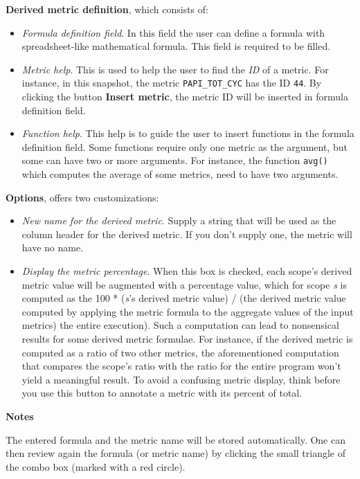 \documentclass[a4paper,11pt]{article}
\begin{document}
\textbf{Derived metric definition}, which consists of:   
\begin{itemize}
	\item \textit{Formula definition field}. In this field the user can define a formula with spreadsheet-like mathematical formula. This field is required to be filled.
	\item \textit{Metric help}. This is used to help the user to find the \textit{ID} of a metric.      For instance, in this snapshot, the metric 
\texttt{PAPI\_TOT\_CYC} has the ID 
\texttt{44}.      By clicking the button \textbf{Insert metric}, the metric ID will be inserted in formula definition field.
	\item \textit{Function help}. This help is to guide the user to insert functions in the formula definition field.      Some functions require only one metric as the argument, but some can have two or more arguments.     For instance, the function 
\texttt{avg()} which computes the average of some metrics, need to have two arguments.
\end{itemize}

\textbf{Options}, offers two customizations:    
\begin{itemize}
	\item \textit{New name for the derived metric}. Supply a string      that will be used as the column header for the derived      metric. If you don't supply one, the metric will have no name.
	\item \textit{Display the metric percentage}. When this box is      checked, each scope's derived metric value will be augmented with      a percentage value, which for scope \textit{s} is computed as the      100 * (\textit{s}'s derived metric value) / (the derived metric      value computed by      applying the metric formula to the aggregate values of the input      metrics)      the entire execution). Such a computation can lead to nonsensical      results for some derived metric formulae. For instance, if the      derived metric is computed as a ratio of two other metrics, the      aforementioned computation that compares the scope's ratio with      the ratio for the entire program won't yield a meaningful result.      To avoid a confusing metric display, think before you use this      button to annotate a metric with its percent of total.      
\end{itemize}\textbf{Notes}

The entered formula and the metric name will be stored automatically.  One can then review again the formula (or metric name) by clicking the  small triangle of the combo box (marked with a red circle). 
\end{document}
